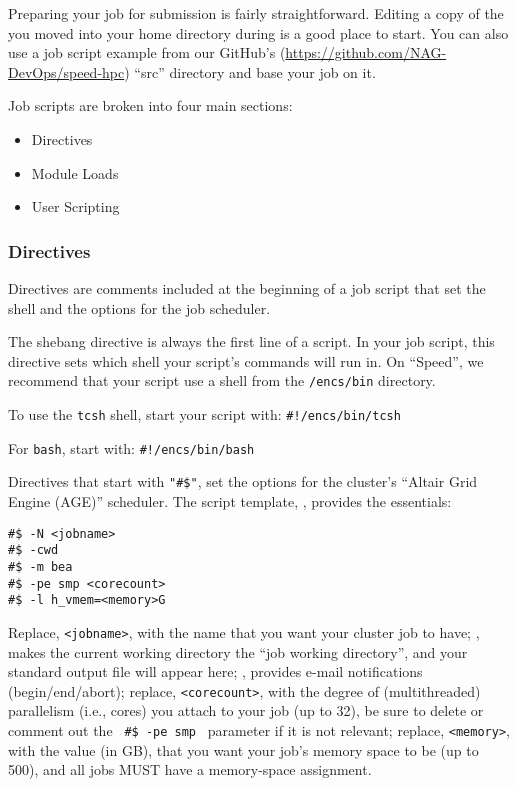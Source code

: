 \documentclass{easychair}
\begin{document}
Preparing your job for submission is fairly straightforward. Editing a copy
of the  you moved into your home directory during
 is a good place to start. You can also use a job script
example from our GitHub's (\url{https://github.com/NAG-DevOps/speed-hpc}) ``src'' 
directory and base your job on it.

Job scripts are broken into four main sections: 
\begin{itemize}
	\item Directives
	\item Module Loads
	\item User Scripting
\end{itemize}

\subsubsection{Directives}

Directives are comments included at the beginning of a job script that set the shell 
and the options for the job scheduler. 

The shebang directive is always the first line of a script. In your job script, 
this directive sets which shell your script's commands will run in. On ``Speed'', 
we recommend that your script use a shell from the \texttt{/encs/bin} directory. 

To use the \texttt{tcsh} shell, start your script with: \verb|#!/encs/bin/tcsh|

For \texttt{bash}, start with: \verb|#!/encs/bin/bash|

Directives that start with \verb|"#$"|, set the options for the cluster's 
``Altair Grid Engine (AGE)'' scheduler. The script template, , 
provides the essentials:

\begin{verbatim}
#$ -N <jobname>
#$ -cwd
#$ -m bea
#$ -pe smp <corecount>
#$ -l h_vmem=<memory>G
\end{verbatim}

Replace, \verb+<jobname>+, with the name that you want your cluster job to have;
, makes the current working directory the ``job working directory'',
and your standard output file will appear here; , provides e-mail
notifications (begin/end/abort); replace, \verb+<corecount>+, with the degree of
(multithreaded) parallelism (i.e., cores) you attach to your job (up to 32),
be sure to delete or comment out the \verb| #$ -pe smp | parameter if it 
is not relevant; replace, \verb+<memory>+, with the value (in GB), that you want 
your job's memory space to be (up to 500), and all jobs MUST have a memory-space 
assignment.
\end{document}
